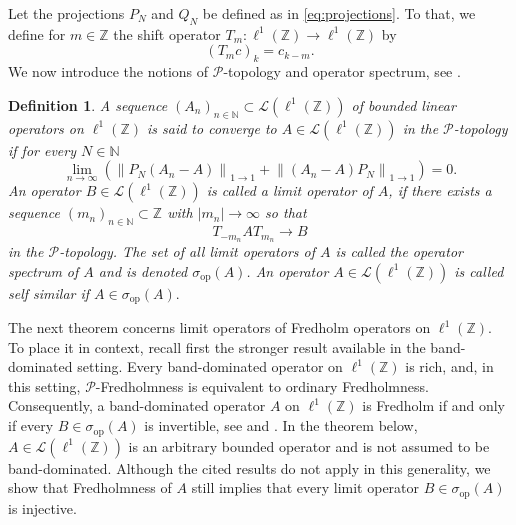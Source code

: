 \documentclass[reqno,a4paper,12pt]{amsart}
\numberwithin{equation}{section}
\newtheorem{definition}{Definition}[section]
\def\N{{\mathbb N}}
\def\Z{{\mathbb Z}}
\newcommand\1{\mathds{1}}
\newcommand{\norm}[1]{\left\lVert #1 \right\rVert}
\newcommand{\abs}[1]{\left\lvert #1 \right\rvert}
\begin{document}
Let the projections $P_N$ and $Q_N$ be defined as in \eqref{eq:projections}. 
To that, we define for $m \in \Z$ the shift operator $T_m : \ell^1(\Z) \to \ell^1(\Z)$ by
$$
(T_m c)_k=c_{k-m}.
$$
We now introduce the notions of $\mathcal{P}$-topology and operator spectrum, see \cite{lindner2006infinite,rabinovitch2004limit}.

\begin{definition}
A sequence $(A_n)_{n \in \N} \subset \mathcal{L}(\ell^1(\Z))$ of bounded linear operators on $\ell^1(\Z)$ is said to
converge to $A \in \mathcal{L}(\ell^1(\Z))$ in the \emph{$\mathcal P$-topology} if for every
$N\in \N$ %
$$
\lim_{n \to \infty} \left(\norm{P_N(A_n-A)}_{1\to1}+\norm{(A_n-A)P_N}_{1\to1}\right) = 0.
$$
An operator $B \in \mathcal{L}(\ell^1(\Z))$ is called a \emph{limit operator} of $A$, if there exists a sequence $(m_n)_{n \in \N}\subset \Z$ with $\abs{m_n}\to \infty$ so that
$$
T_{-m_n}AT_{m_n}\to B
$$
in the $\mathcal P$-topology. The set of all limit operators of $A$ is called the
\emph{operator spectrum} of $A$ and is denoted $\sigma_{\mathrm{op}}(A)$.
An operator $A \in \mathcal{L}(\ell^1(\Z))$ is called \emph{self similar} if $A\in \sigma_{\mathrm{op}}(A).$
\end{definition}

The next theorem concerns limit operators of Fredholm operators on $\ell^1(\Z)$. To place it in context, recall first the stronger result available in the band-dominated setting. Every band-dominated operator on $\ell^1(\Z)$ is rich, and, in this setting, $\mathcal P$-Fredholmness is equivalent to ordinary Fredholmness. Consequently, a band-dominated operator $A$ on $\ell^1(\Z)$ is Fredholm if and only if every $B\in\sigma_{\mathrm{op}}(A)$ is invertible, see \cite[Thm.~5.7]{seidel2015semi} and \cite[Thm.~11]{lindner2014affirmative}. In the theorem below, $A\in\mathcal L(\ell^1(\Z))$ is an arbitrary bounded operator and is not assumed to be band-dominated. Although the cited results do not apply in this generality, we show that Fredholmness of $A$ still implies that every limit operator $B\in\sigma_{\mathrm{op}}(A)$ is injective.

\end{document}
